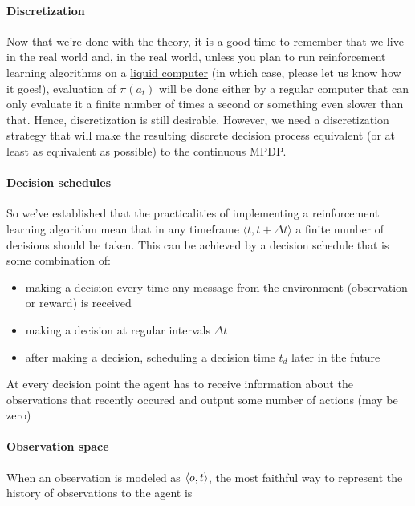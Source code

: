 \paragraph{Discretization}

Now that we're done with the theory, it is a good time to remember that
we live in the real world and, in the real world, unless you plan to run
reinforcement learning algorithms on a
\href{https://royalsocietypublishing.org/doi/10.1098/rstb.2018.0372}{liquid
computer} (in which case, please let us know how it goes!), evaluation
of $\pi(a_t)$ will be done
either by a regular computer that can only evaluate it a finite number
of times a second or something even slower than that. Hence,
discretization is still desirable. However, we need a discretization
strategy that will make the resulting discrete decision process
equivalent (or at least as equivalent as possible) to the continuous
MPDP.

\paragraph{Decision schedules}

So we've established that the practicalities of implementing a
reinforcement learning algorithm mean that in any timeframe
$\langle t, t + \Delta t \rangle$ a finite number of decisions should
be taken. This can be achieved by a decision schedule that is some
combination of:

\begin{itemize}
\item
  making a decision every time any message from the environment
  (observation or reward) is received
\item
  making a decision at regular intervals
  $\Delta t$
\item
  after making a decision, scheduling a decision time
  $t_d$ later in the future
\end{itemize}

At every decision point the agent has to receive information about the
observations that recently occured and output some number of actions
(may be zero)

\paragraph{Observation space}

When an observation is modeled as $\langle o, t \rangle$, the most faithful way to represent the history of observations to the agent is

